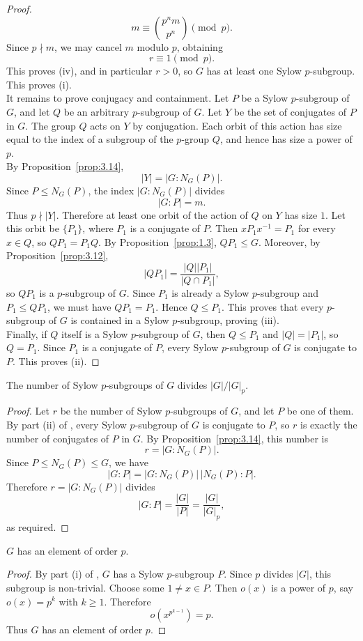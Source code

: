 \documentclass[../Odyssey_Project.tex]{subfiles}
\begin{document}
\begin{proof}
\[
    m \equiv \binom{p^n m}{p^n} \pmod{p}.
\]
Since $p\nmid m$, we may cancel $m$ modulo $p$, obtaining
\[
    r \equiv 1 \pmod{p}.
\]
This proves (iv), and in particular $r>0$, so $G$ has at least one Sylow $p$-subgroup. This proves (i).\\
It remains to prove conjugacy and containment. Let $P$ be a Sylow $p$-subgroup of $G$, and let $Q$ be an arbitrary $p$-subgroup of $G$. Let $Y$ be the set of conjugates of $P$ in $G$. The group $Q$ acts on $Y$ by conjugation. Each orbit of this action has size equal to the index of a subgroup of the $p$-group $Q$, and hence has size a power of $p$.\\
By Proposition~\ref{prop:3.14},
\[
    |Y| = |G : N_G(P)|.
\]
Since $P \leq N_G(P)$, the index $|G : N_G(P)|$ divides
\[
    |G : P| = m.
\]
Thus $p\nmid |Y|$. Therefore at least one orbit of the action of $Q$ on $Y$ has size $1$. Let this orbit be $\{P_1\}$, where $P_1$ is a conjugate of $P$. Then $xP_1x^{-1}=P_1$ for every $x\in Q$, so $QP_1=P_1Q$. By Proposition~\ref{prop:1.3}, $QP_1\leq G$. Moreover, by Proposition~\ref{prop:3.12},
\[
    |QP_1|=\frac{|Q||P_1|}{|Q\cap P_1|},
\]
so $QP_1$ is a $p$-subgroup of $G$. Since $P_1$ is already a Sylow $p$-subgroup and $P_1\leq QP_1$, we must have $QP_1=P_1$. Hence $Q\leq P_1$. This proves that every $p$-subgroup of $G$ is contained in a Sylow $p$-subgroup, proving (iii).\\
Finally, if $Q$ itself is a Sylow $p$-subgroup of $G$, then $Q\leq P_1$ and $|Q|=|P_1|$, so $Q=P_1$. Since $P_1$ is a conjugate of $P$, every Sylow $p$-subgroup of $G$ is conjugate to $P$. This proves (ii).
\end{proof}

\begin{corollary}
\label{cor:7.1}
The number of Sylow $p$-subgroups of $G$ divides $|G|/|G|_p$.
\end{corollary}
\begin{proof}
Let $r$ be the number of Sylow $p$-subgroups of $G$, and let $P$ be one of them. By part (ii) of , every Sylow $p$-subgroup of $G$ is conjugate to $P$, so $r$ is exactly the number of conjugates of $P$ in $G$. By Proposition~\ref{prop:3.14}, this number is
\[
    r = |G : N_G(P)|.
\]
Since $P \leq N_G(P) \leq G$, we have
\[
    |G : P| = |G : N_G(P)|\,|N_G(P) : P|.
\]
Therefore $r=|G:N_G(P)|$ divides
\[
    |G:P|=\frac{|G|}{|P|}=\frac{|G|}{|G|_p},
\]
as required.
\end{proof}

\begin{namedtheorem}
\label{thm:cauchy}
$G$ has an element of order $p$.
\end{namedtheorem}
\begin{proof}
By part (i) of , $G$ has a Sylow $p$-subgroup $P$. Since $p$ divides $|G|$, this subgroup is non-trivial. Choose some $1\neq x\in P$. Then $o(x)$ is a power of $p$, say $o(x)=p^k$ with $k\geq 1$. Therefore
\[
    o\left(x^{p^{k-1}}\right)=p.
\]
Thus $G$ has an element of order $p$.
\end{proof}
\end{document}
